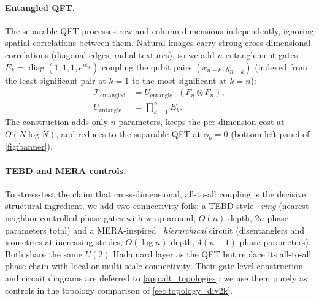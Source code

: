 \documentclass[a4paper, twocolumn]{quantumarticle}
\newcommand{\TT}{\mathcal{T}}
\newcommand{\diag}{\operatorname{diag}}
\begin{document}
\paragraph{Entangled QFT.}
\label{sec:entangled_qft}
The separable QFT processes row and column dimensions independently, ignoring spatial correlations between them.
Natural images carry strong cross-dimensional correlations (diagonal edges, radial textures), so we add $n$ entanglement gates $E_k = \diag(1, 1, 1, e^{i\phi_k})$ coupling the qubit pairs $(x_{n-k}, y_{n-k})$ (indexed from the least-significant pair at $k=1$ to the most-significant at $k=n$):
\begin{align}
  \TT_{\text{entangled}} &= U_{\text{entangle}} \cdot (F_n \otimes F_n), \nonumber \\
  U_{\text{entangle}} &= \prod_{k=1}^n E_k.
  \label{eq:entangled_qft}
\end{align}
The construction adds only $n$ parameters, keeps the per-dimension cost at $O(N \log N)$, and reduces to the separable QFT at $\phi_k = 0$ (bottom-left panel of \cref{fig:banner}).

\paragraph{TEBD and MERA controls.}
\label{sec:alt_topologies}
To stress-test the claim that cross-dimensional, all-to-all coupling is the decisive structural ingredient, we add two connectivity foils: a TEBD-style~\cite{vidal2004tebd} \emph{ring} (nearest-neighbor controlled-phase gates with wrap-around, $O(n)$ depth, $2n$ phase parameters total) and a MERA-inspired~\cite{vidal2007mera} \emph{hierarchical} circuit (disentanglers and isometries at increasing strides, $O(\log n)$ depth, $4(n-1)$ phase parameters).
Both share the same $U(2)$ Hadamard layer as the QFT but replace its all-to-all phase chain with local or multi-scale connectivity.
Their gate-level construction and circuit diagrams are deferred to \cref{app:alt_topologies}; we use them purely as controls in the topology comparison of \cref{sec:topology_div2k}.

\begin{table}[tbp]
\centering
\caption{Comparison of the four basic-variant topologies for an image of size $2^n \times 2^n$ ($n$ qubits per dimension).}
\label{tab:circuits}
\end{table}
\end{document}
